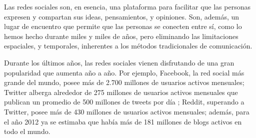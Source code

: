 




Las redes sociales son, en esencia, una plataforma para facilitar que las personas expresen y compartan sus ideas, pensamientos, y opiniones.
Son, además, un lugar de encuentro que permite que las personas se conecten entre sí, como lo hemos hecho durante miles y miles de años, pero eliminando las limitaciones espaciales, y temporales, inherentes a los métodos tradicionales de comunicación.

Durante los últimos años, las redes sociales vienen disfrutando de una gran popularidad que aumenta año a año. Por ejemplo, Facebook, la red social más grande del mundo, posee más de 2.700 millones de usuarios activos mensuales\cite{facebook2020}; Twitter alberga alrededor de 275 millones de usuarios activos mensuales que publican un promedio de 500 millones de tweets por día \cite{twitter2020}; Reddit, superando a Twitter, posee más de 430 millones de usuarios activos mensuales\cite{reddit2020}; además, para el año 2012 ya se estimaba que había más de 181 millones de blogs activos en todo el mundo\cite{nielsen2012}.

